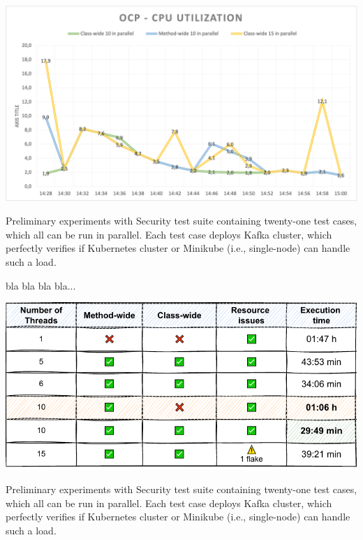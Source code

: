 \begin{table}[ht!]
    \centering
    \includegraphics[scale=0.7]{obrazky-figures/08-experiments/06-exp-graph-test}
    \caption{Preliminary experiments with Security test suite containing twenty-one test cases, which all can be run in parallel.
    Each test case deploys Kafka cluster, which perfectly verifies if Kubernetes cluster or Minikube (i.e., single-node) can handle such a load.}
    \label{06:tab:01:securityst-minikube}
\end{table}

bla bla bla bla...

\begin{table}[ht!]
    \centering
    \includegraphics[scale=0.8]{obrazky-figures/08-experiments/06-exp-preliminary-cluster-wide-ocp}
    \caption{Preliminary experiments with Security test suite containing twenty-one test cases, which all can be run in parallel.
    Each test case deploys Kafka cluster, which perfectly verifies if Kubernetes cluster or Minikube (i.e., single-node) can handle such a load.}
    \label{06:tab:01:securityst-minikube}
\end{table}



